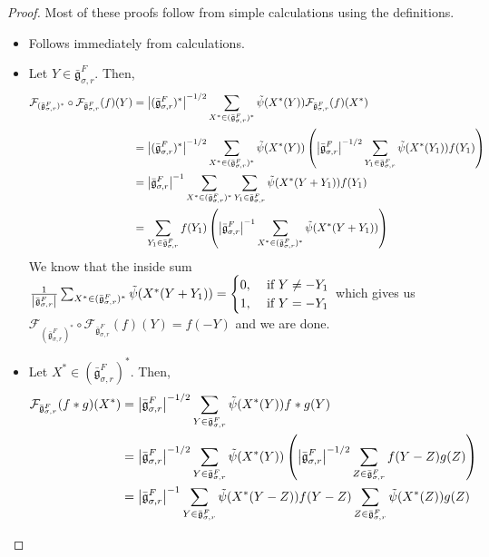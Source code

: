 \documentclass[10pt,a4paper]{amsart}
\newcommand{\bg}{\bar{\mathfrak g}}
\newcommand{\mcF}{\mathcal F}
\begin{document}
\begin{proof}
    Most of these proofs follow from simple calculations using the definitions.
    \begin{itemize}
       \item[(i)]  Follows immediately from calculations.
        \item [(ii)] Let $Y \in \bg_{\sigma,r}^F$. Then, \begin{align*}
            \mcF_{(\bg_{\sigma,r}^F)^*}\circ\mcF_{\bg_{\sigma,r}^F}(f)(Y)& =\left|(\bg_{\sigma,r}^F)^*\right|^{-1/2}\sum_{X^*\in (\bg_{\sigma,r}^F)^*}\Tilde\psi( X^*(Y))\mcF_{\bg_{\sigma,r}^F}(f)(X^*)\\
            &= \left|(\bg_{\sigma,r}^F)^*\right|^{-1/2}\sum_{X^*\in (\bg_{\sigma,r}^F)^*}\Tilde\psi( X^*(Y)) \left(\left|\bg_{\sigma,r}^F\right|^{-1/2}\sum_{Y_1\in \bg_{\sigma,r}^F}\Tilde\psi( X^*(Y_1))f(Y_1)\right)\\
            &= \left|\bg_{\sigma,r}^F\right|^{-1}\sum_{X^*\in (\bg_{\sigma,r}^F)^*}\sum_{Y_1\in \bg_{\sigma,r}^F}\Tilde\psi( X^*(Y+Y_1)) f(Y_1)\\
            &= \sum_{Y_1\in \bg_{\sigma,r}^F}f(Y_1)\left( \left|\bg_{\sigma,r}^F\right|^{-1} \sum_{X^*\in (\bg_{\sigma,r}^F)^*} \Tilde\psi( X^*(Y+Y_1))\right)
        \end{align*}
        We know that the inside sum $ \frac{1}{\left|\bg_{\sigma,r}^F\right|}\sum_{X^*\in (\bg_{\sigma,r}^F)^*} \Tilde\psi( X^*(Y+Y_1))= \begin{cases} 0, & \text{ if } Y \neq -Y_1\\
        1, &\text{ if } Y = -Y_1\\
        \end{cases}$ which gives us $\mcF_{(\bg_{\sigma,r}^F)^*}\circ\mcF_{\bg_{\sigma,r}^F}(f)(Y)= f (-Y)$ and we are done. 
        \item[(iii)] Let $X^* \in (\bg_{\sigma,r}^F)^*$. Then, 
        \begin{align*}
            \mcF_{\bg_{\sigma,r}^F}(f*g)(X^*)&= \left|\bg_{\sigma,r}^F\right|^{-1/2}\sum_{Y\in \bg_{\sigma,r}^F}\Tilde\psi( X^*(Y))f*g(Y)\\
            &= \left|\bg_{\sigma,r}^F\right|^{-1/2}\sum_{Y\in \bg_{\sigma,r}^F}\Tilde\psi( X^*(Y))\left( \left|\bg_{\sigma,r}^F\right|^{-1/2}\sum_{Z\in \bg_{\sigma,r}^F}f(Y-Z)g(Z)\right)\\
            &= \left|\bg_{\sigma,r}^F\right|^{-1} \sum_{Y\in \bg_{\sigma,r}^F}\Tilde\psi( X^*(Y-Z))f(Y-Z)\sum_{Z\in \bg_{\sigma,r}^F}\Tilde\psi( X^*(Z))g(Z)\\

\end{align*}
\end{itemize}
\end{proof}
\end{document}
